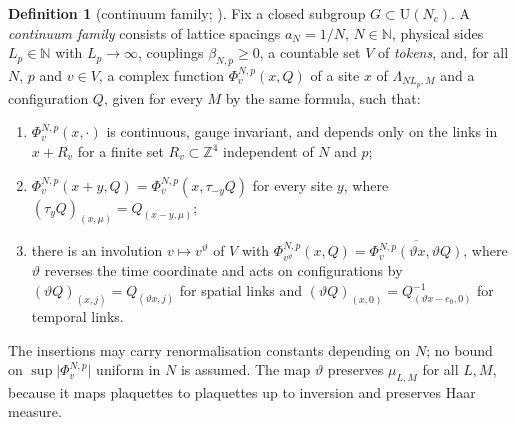 \documentclass[11pt,a4paper]{amsart}
\theoremstyle{definition}
\newtheorem{definition}[theorem]{Definition}
\theoremstyle{remark}
\numberwithin{equation}{section}
\newcommand{\Z}{\mathbb{Z}}          %
\newcommand{\Nat}{\mathbb{N}}        %
\newcommand{\abs}[1]{\lvert #1\rvert}      %
\newcommand{\U}{\mathrm{U}}                %
\newcommand{\aN}{a_N}                      %
\newcommand{\Lp}{L_p}                      %
\newcommand{\betaNp}{\beta_{N,p}}          %
\begin{document}
\begin{definition}[{continuum family; \cite[Definition~3]{bhattacharjee2026first}}]\label{def:continuum-family}
Fix a closed subgroup $G\subset\U(N_c)$. A \emph{continuum family} consists of lattice spacings $\aN=1/N$, $N\in\Nat$, physical sides $\Lp\in\Nat$ with $\Lp\to\infty$, couplings $\betaNp\ge0$, a countable set $V$ of \emph{tokens}, and, for all $N$, $p$ and $v\in V$, a complex function $\Phi^{N,p}_v(x,Q)$ of a site $x$ of $\Lambda_{N\Lp,M}$ and a configuration $Q$, given for every $M$ by the same formula, such that:
\begin{enumerate}[label=(F\arabic*),leftmargin=3em]
\item $\Phi^{N,p}_v(x,\cdot)$ is continuous, gauge invariant, and depends only on the links in $x+R_v$ for a finite set $R_v\subset\Z^4$ independent of $N$ and $p$;
\item $\Phi^{N,p}_v(x+y,Q)=\Phi^{N,p}_v(x,\tau_{-y}Q)$ for every site $y$, where $(\tau_yQ)_{(x,\mu)}=Q_{(x-y,\mu)}$;
\item there is an involution $v\mapsto v^\vartheta$ of $V$ with $\Phi^{N,p}_{v^\vartheta}(x,Q)=\overline{\Phi^{N,p}_v(\vartheta x,\vartheta Q)}$, where $\vartheta$ reverses the time coordinate and acts on configurations by $(\vartheta Q)_{(x,j)}=Q_{(\vartheta x,j)}$ for spatial links and $(\vartheta Q)_{(x,0)}=Q_{(\vartheta x-e_0,0)}^{-1}$ for temporal links.
\end{enumerate}
\end{definition}

The insertions may carry renormalisation constants depending on $N$; no bound on $\sup\abs{\Phi^{N,p}_v}$ uniform in $N$ is assumed. The map $\vartheta$ preserves $\mu_{L,M}$ for all $L,M$, because it maps plaquettes to plaquettes up to inversion and preserves Haar measure.
\end{document}
